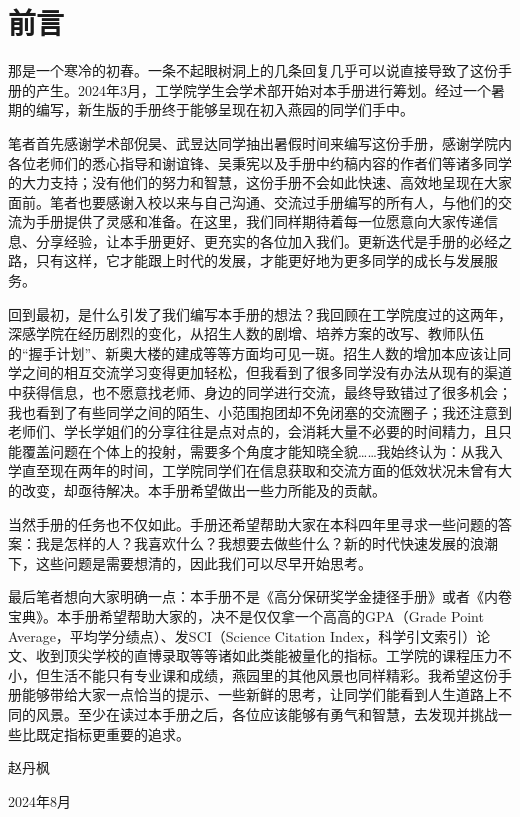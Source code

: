 \documentclass[11pt,oneside]{book}
\begin{document}
\chapter*{前言}
那是一个寒冷的初春。一条不起眼树洞上的几条回复几乎可以说直接导致了这份手册的产生。2024年3月，工学院学生会学术部开始对本手册进行筹划。经过一个暑期的编写，新生版的手册终于能够呈现在初入燕园的同学们手中。

\vspace{10pt}

笔者首先感谢学术部倪昊、武昱达同学抽出暑假时间来编写这份手册，感谢学院内各位老师们的悉心指导和谢谊锋、吴秉宪以及手册中约稿内容的作者们等诸多同学的大力支持；没有他们的努力和智慧，这份手册不会如此快速、高效地呈现在大家面前。笔者也要感谢入校以来与自己沟通、交流过手册编写的所有人，与他们的交流为手册提供了灵感和准备。在这里，我们同样期待着每一位愿意向大家传递信息、分享经验，让本手册更好、更充实的各位加入我们。更新迭代是手册的必经之路，只有这样，它才能跟上时代的发展，才能更好地为更多同学的成长与发展服务。

\vspace{10pt}

回到最初，是什么引发了我们编写本手册的想法？我回顾在工学院度过的这两年，深感学院在经历剧烈的变化，从招生人数的剧增、培养方案的改写、教师队伍的“握手计划”、新奥大楼的建成等等方面均可见一斑。招生人数的增加本应该让同学之间的相互交流学习变得更加轻松，但我看到了很多同学没有办法从现有的渠道中获得信息，也不愿意找老师、身边的同学进行交流，最终导致错过了很多机会；我也看到了有些同学之间的陌生、小范围抱团却不免闭塞的交流圈子；我还注意到老师们、学长学姐们的分享往往是点对点的，会消耗大量不必要的时间精力，且只能覆盖问题在个体上的投射，需要多个角度才能知晓全貌……我始终认为：从我入学直至现在两年的时间，工学院同学们在信息获取和交流方面的低效状况未曾有大的改变，却亟待解决。本手册希望做出一些力所能及的贡献。

\vspace{10pt}

当然手册的任务也不仅如此。手册还希望帮助大家在本科四年里寻求一些问题的答案：我是怎样的人？我喜欢什么？我想要去做些什么？新的时代快速发展的浪潮下，这些问题是需要想清的，因此我们可以尽早开始思考。

\vspace{10pt}

最后笔者想向大家明确一点：本手册不是《高分保研奖学金捷径手册》或者《内卷宝典》。本手册希望帮助大家的，决不是仅仅拿一个高高的GPA（Grade Point Average，平均学分绩点）、发SCI（Science Citation Index，科学引文索引）论文、收到顶尖学校的直博录取等等诸如此类能被量化的指标。工学院的课程压力不小，但生活不能只有专业课和成绩，燕园里的其他风景也同样精彩。我希望这份手册能够带给大家一点恰当的提示、一些新鲜的思考，让同学们能看到人生道路上不同的风景。至少在读过本手册之后，各位应该能够有勇气和智慧，去发现并挑战一些比既定指标更重要的追求。
\begin{flushright}
	赵丹枫
	
	2024年8月
\end{flushright}
\end{document}
